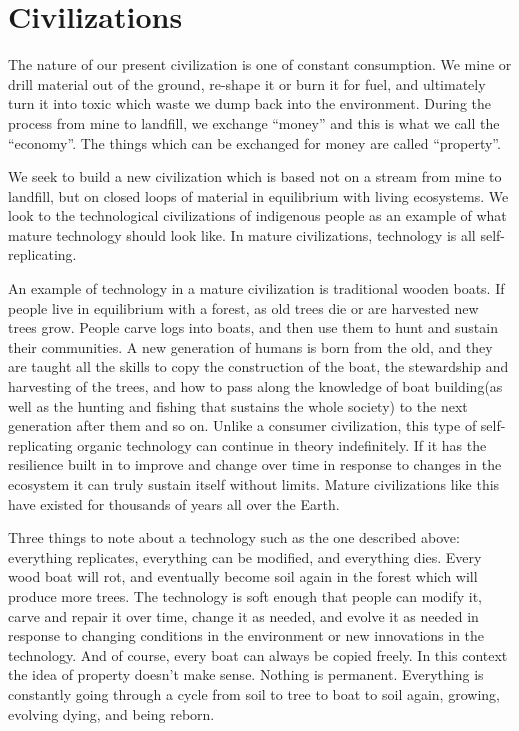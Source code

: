 \documentclass[12pt,a4paper]{amsart}
\numberwithin{equation}{section}
\begin{document}
\section{Civilizations}\label{civilizations}

The nature of our present civilization is one of constant consumption.
We mine or drill material out of the ground, re-shape it or burn it for
fuel, and ultimately turn it into toxic which waste we dump back into
the environment. During the process from mine to landfill, we exchange
``money'' and this is what we call the ``economy''. The things which can
be exchanged for money are called ``property''.

We seek to build a new civilization which is based not on a stream from
mine to landfill, but on closed loops of material in equilibrium with
living ecosystems. We look to the technological civilizations of
indigenous people as an example of what mature technology should look
like. In mature civilizations, technology is all self-replicating.

An example of technology in a mature civilization is traditional wooden
boats. If people live in equilibrium with a forest, as old trees die or
are harvested new trees grow. People carve logs into boats, and then use
them to hunt and sustain their communities. A new generation of humans
is born from the old, and they are taught all the skills to copy the
construction of the boat, the stewardship and harvesting of the trees,
and how to pass along the knowledge of boat building(as well as the
hunting and fishing that sustains the whole society) to the next
generation after them and so on. Unlike a consumer civilization, this
type of self-replicating organic technology can continue in theory
indefinitely. If it has the resilience built in to improve and change
over time in response to changes in the ecosystem it can truly sustain
itself without limits. Mature civilizations like this have existed for
thousands of years all over the Earth.

Three things to note about a technology such as the one described above:
everything replicates, everything can be modified, and everything dies.
Every wood boat will rot, and eventually become soil again in the forest
which will produce more trees. The technology is soft enough that people
can modify it, carve and repair it over time, change it as needed, and
evolve it as needed in response to changing conditions in the
environment or new innovations in the technology. And of course, every
boat can always be copied freely. In this context the idea of property
doesn't make sense. Nothing is permanent. Everything is constantly going
through a cycle from soil to tree to boat to soil again, growing,
evolving dying, and being reborn.
\end{document}
